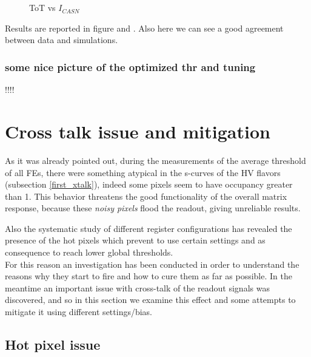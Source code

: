 \begin{figure}[h!]
\centering
{}\\%
{}\\
\caption{ToT vs $I_{CASN}$}
\label{fig:tot_vs_icasn}
\end{figure}

Results are reported in figure  and . Also here we can see a good agreement between data and simulations.

\subsubsection{some nice picture of the optimized thr and tuning}

!!!!


\section{Cross talk issue and mitigation} \label{xtalk}

As it was already pointed out, during the measurements of the average threshold of all FEs, there were something atypical in the s-curves of the HV flavors (subsection \vref{first_xtalk}), indeed some pixels seem to have occupancy greater than 1. This behavior threatens the good functionality of the overall matrix response, because these \textit{noisy pixels} flood the readout, giving unreliable results.

Also the systematic study of different register configurations has revealed the presence of the hot pixels which prevent to use certain settings and as consequence to reach lower global thresholds. \\

For this reason an investigation has been conducted in order to understand the reasons why they start to fire and how to cure them as far as possible.
In the meantime an important issue with cross-talk of the readout signals was discovered, and so in this section we examine this effect and some attempts to mitigate it using different settings/bias.


\subsection{Hot pixel issue}

